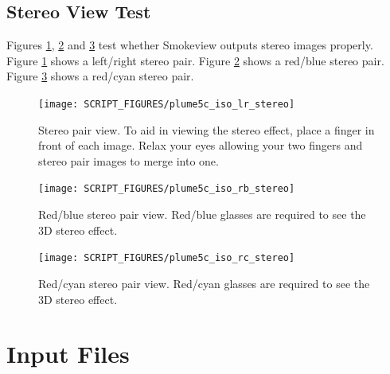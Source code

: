 \documentclass[11pt,twoside]{book}
\begin{document}
\clearpage

\section{Stereo View Test}

Figures \ref{figlrstereo}, \ref{figrbstereo} and  \ref{figrcstereo} test whether Smokeview outputs stereo images properly.  Figure \ref{figlrstereo} shows a left/right stereo pair.  Figure \ref{figrbstereo} shows a red/blue stereo pair.  Figure \ref{figrcstereo} shows a red/cyan stereo pair.

\begin{figure}[bph]
\begin{center}
\texttt{[image: SCRIPT\_FIGURES/plume5c\_iso\_lr\_stereo]}
\caption[Stereo pair view.]{ Stereo
pair view. To aid in viewing the
stereo effect, place a finger in front of each image.  Relax your
eyes allowing your two fingers and stereo pair images to merge
into one. } \label{figlrstereo}
\end{center}
\end{figure}

\begin{figure}[bph]
\begin{center}
\texttt{[image: SCRIPT\_FIGURES/plume5c\_iso\_rb\_stereo]}
\caption[Red/blue stereo pair view.]{
Red/blue stereo pair view. Red/blue
glasses are required to see the 3D stereo effect. }
\label{figrbstereo}
\end{center}
\end{figure}

\begin{figure}[bph]
\begin{center}
\texttt{[image: SCRIPT\_FIGURES/plume5c\_iso\_rc\_stereo]}
\caption[Red/cyan stereo pair view.]{
Red/cyan stereo pair view. Red/cyan
glasses are required to see the 3D stereo effect. }
\label{figrcstereo}
\end{center}
\end{figure}



\appendix
{}

\chapter{Input Files}
\label{fdsinputfiles}
\end{document}
